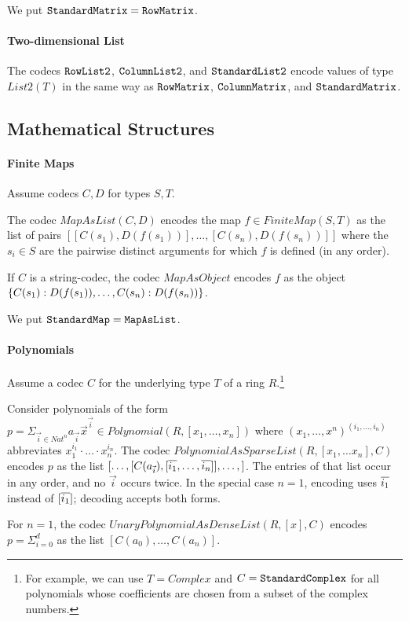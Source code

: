 We put $\cn{StandardMatrix}=\cn{RowMatrix}$.

\paragraph{Two-dimensional List}
The codecs $\cn{RowList2}$, $\cn{ColumnList2}$, and $\cn{StandardList2}$ encode values of type $List2(T)$ in the same way as $\cn{RowMatrix}$, $\cn{ColumnMatrix}$, and $\cn{StandardMatrix}$.

\subsection{Mathematical Structures}

\paragraph{Finite Maps}
Assume codecs $C,D$ for types $S,T$.

The codec $MapAsList(C,D)$ encodes the map $f\in FiniteMap(S,T)$ as the list of pairs $[[C(s_1),D(f(s_1))],\ldots,[C(s_n),D(f(s_n))]]$ where the $s_i\in S$ are the pairwise distinct arguments for which $f$ is defined (in any order).

If $C$ is a string-codec, the codec $MapAsObject$ encodes $f$ as the object $\jobj{C(s_1):D(f(s_1)),\ldots,C(s_n):D(f(s_n))}$.

We put $\cn{StandardMap}=\cn{MapAsList}$.

\paragraph{Polynomials}
Assume a codec $C$ for the underlying type $T$ of a ring $R$.\footnote{For example, we can use $T=Complex$ and $C=\cn{StandardComplex}$ for all polynomials whose coefficients are chosen from a subset of the complex numbers.}

Consider polynomials of the form $p=\Sigma_{\vec{i}\in Nat^n} a_{\vec{i}} \vec{x}^{\vec{i}}\in Polynomial(R,[x_1,\ldots,x_n])$ where $(x_1,\ldots,x^n)^{(i_1,\ldots,i_n)}$ abbreviates $x_1^{i_1}\cdot \ldots\cdot x_n^{i_n}$.
The codec $PolynomialAsSparseList(R,[x_1,\ldots x_n],C)$ encodes $p$ as the list $[\ldots,[C(a_{\vec{i}}),[\ov{i_1},\ldots,\ov{i_n}]],\ldots,]$.
The entries of that list occur in any order, and no $\vec{i}$ occurs twice.
In the special case $n=1$, encoding uses $\ov{i_1}$ instead of $[\ov{i_1}]$; decoding accepts both forms.

For $n=1$, the codec $UnaryPolynomialAsDenseList(R,[x],C)$ encodes $p=\Sigma_{i=0}^d$ as the list $[C(a_0),\ldots,C(a_n)]$.

